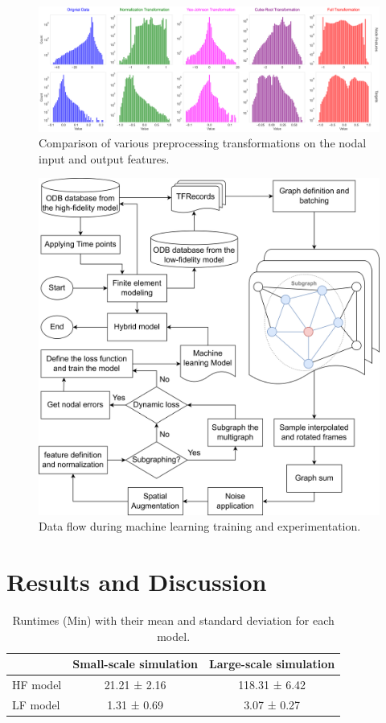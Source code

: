 \documentclass[12pt,a4paper]{report}
\begin{document}
\begin{figure}
    \centering
    \includegraphics[width=\textheight,keepaspectratio]{normalization.png}
    \caption{Comparison of various preprocessing transformations on the nodal input and output features.}
    \label{fig:normalization}
\end{figure}

\begin{figure}\centering
\includegraphics[width=0.6\linewidth,keepaspectratio]{experiment.png}
\caption{Data flow during machine learning training and experimentation.}\label{fig:experiment}
\end{figure}

\section{Results and Discussion}
%
\begin{table}
\caption{Runtimes (Min) with their mean and standard deviation for each model.}\centering
\label{tabel:runtimes_stats}
\begin{tabular}{lcc}
\toprule
 & \textbf{Small-scale simulation} & \textbf{Large-scale simulation} \\
\midrule
HF model & 21.21 ± 2.16 & 118.31 ± 6.42 \\
LF model & 1.31 ± 0.69 & 3.07 ± 0.27 \\
\bottomrule
\end{tabular}
\end{table}
\end{document}

